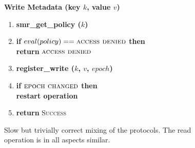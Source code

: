 \begin{figure}[t]
  \begin{small}
    \textbf{Write Metadata (key $k$, value $v$)}

    \begin{enumerate}[itemsep=0pt,parsep=0pt]

        \item \textbf{smr\_get\_policy ($k$)}

        \item \textbf{if} $eval(policy) == \textsc{access denied}$ \textbf{then}\\
            \tabto{.5cm}    \textbf{return} $\textsc{access denied}$

        \item \textbf{register\_write ($k$, $v$, $epoch$)}

        \item \textbf{if} $\textsc{epoch changed}$ \textbf{then}\\
            \tabto{.5cm}    \textbf{restart operation}

        \item \textbf{return} \textsc{Success}
    \end{enumerate}

  \end{small}
  \caption{Slow but trivially correct mixing of the protocols.
    The read operation is in all aspects similar.}\label{fig:teems_slow_correct}
\end{figure}
